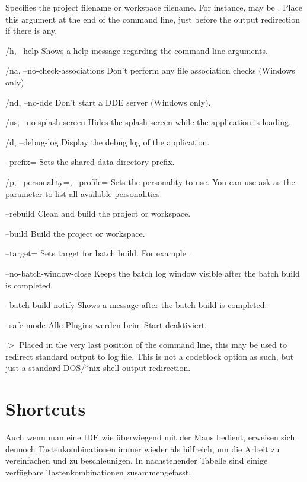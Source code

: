 \begin{optentry}
\item[\var{filename}] Specifies the project  filename or workspace  filename. For instance,  may be . Place this argument at the end of the command line, just before the output redirection if there is any.
\item[/h, --help] Shows a help message regarding the command line arguments.
\item[/na, --no-check-associations] Don't perform any file association checks (Windows only).
\item[/nd, --no-dde] Don't start a DDE server (Windows only).
\item[/ns, --no-splash-screen] Hides the splash screen while the application is loading.
\item[/d, --debug-log] Display the debug log of the application.
\item[--prefix=\var{str}] Sets the shared data directory prefix.
\item[/p, --personality=\var{str}, --profile=\var{str}] Sets the personality to use. You can use ask as the parameter to list all available personalities.
\item[--rebuild] Clean and build the project or workspace.
\item[--build] Build the project or workspace.
\item[--target=\var{str}] Sets target for batch build. For example .
\item[--no-batch-window-close] Keeps the batch log window visible after the batch build is completed.
\item[--batch-build-notify] Shows a message after the batch build is completed.
\item[--safe-mode] Alle Plugins werden beim Start deaktiviert.
\item[$>$ \var{build log file}] Placed in the very last position of the command line, this may be used to redirect standard output to log file. This is not a codeblock option as such, but just a standard DOS/*nix shell output redirection.
\end{optentry}

\section{Shortcuts}

Auch wenn man eine IDE wie \codeblocks überwiegend mit der Maus bedient, erweisen sich dennoch Tastenkombinationen immer wieder als hilfreich, um die Arbeit zu vereinfachen und zu beschleunigen. In nachstehender Tabelle sind einige verfügbare Tastenkombinationen zusammengefasst.


